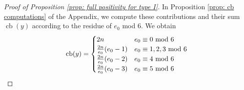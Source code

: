 \documentclass[12pt]{amsart}
\numberwithin{equation}{section}
\theoremstyle{definition}
\newcommand{\tx}[1]{\text{#1}}
\DeclareMathOperator{\cb}{cb}
\begin{document}
\begin{proof}[Proof of Proposition \ref{prop: full positivity for type I}]
    In Proposition \ref{prop: cb computations} of the Appendix, we compute these contributions and their sum $\cb(y)$ according to the residue of $e_0$ mod $6$. We obtain
    \[\cb(y)=\begin{cases}
        2n&e_0\equiv0\textup{ mod }6\\
        \frac{2n}{e_0}(e_0-1)&e_0\equiv1,2,3\textup{ mod }6\\
        \frac{2n}{e_0}(e_0-2)&e_0\equiv4\textup{ mod }6\\
        \frac{2n}{e_0}(e_0-3)&e_0\equiv5\textup{ mod }6\\
    \end{cases}\]




\end{proof}
\end{document}
